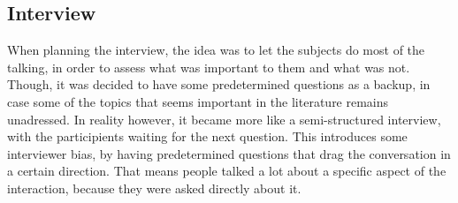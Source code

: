 \subsection{Interview}
When planning the interview, the idea was to let the subjects do most of the talking, in order to assess what was important to them and what was not. Though, it was decided to have some predetermined questions as a backup, in case some of the topics that seems important in the literature remains unadressed. In reality however, it became more like a semi-structured interview, with the participients waiting for the next question. This introduces some interviewer bias, by having predetermined questions that drag the conversation in a certain direction. That means people talked a lot about a specific aspect of the interaction, because they were asked directly about it. 